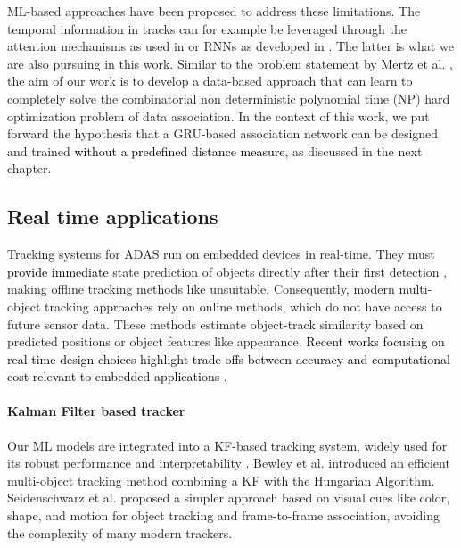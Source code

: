 \documentclass[letterpaper, 10 pt, journal, twoside]{IEEEtran}
\newcommand{\red}[1]{\textcolor{black}{#1}}
\begin{document}
\ac{ML}-based approaches have been proposed to address these limitations.
The temporal information in tracks can for example be leveraged through the attention mechanisms as used in {\cite{DL_ATT_CNN_soda.2020, DL_ATT_CNN_mot_sot_based.2017}} or \acp{RNN} as developed in {\cite{DL_RNN_mot.2016, DL_RNN_data_association.2019}}.
The latter is what we are also pursuing in this work.
Similar to the problem statement by Mertz et al. {\cite{DL_RNN_data_association.2019}}, the aim of our work is to develop a data-based approach that can learn to completely solve the combinatorial non deterministic polynomial time (NP) hard optimization problem of data association.
In the context of this work, we put forward the hypothesis that a \ac{GRU}-based association network can be designed and trained \red{without a predefined distance measure}, as discussed in the next chapter.

\subsection{Real time applications}
Tracking systems for ADAS run on embedded devices in real-time. They must \red{provide immediate} state prediction of objects directly after their first detection {\cite{KF_Bewley.2016,DL_Wojke.2017}}, making offline tracking methods like {\cite{offline_mot.2017}} unsuitable. Consequently, modern multi-object tracking approaches rely on online methods, which do not have access to future sensor data. These methods estimate object-track similarity based on predicted positions or object features like appearance.
\red{Recent works focusing on real-time design choices highlight trade-offs between accuracy and computational cost relevant to embedded applications {\cite{Wang2019RealtimeMOT,Zhou2020CenterTrack}}.}

\paragraph{Kalman Filter based tracker}
Our \ac{ML} models are integrated into a \ac{KF}-based tracking system, widely used for its robust performance and interpretability {\cite{KF_Wan.2000,KF_Ristic.2004,KF_Julier.2004,KF_framework.2013,KF_Bewley.2016,KF_simple_cues.2022,KF_BoundingBD.2023}}. Bewley et al. {\cite{KF_Bewley.2016}} introduced an efficient multi-object tracking method combining a KF with the Hungarian Algorithm. Seidenschwarz et al. {\cite{KF_simple_cues.2022}} proposed a simpler approach based on visual cues like color, shape, and motion for object tracking and frame-to-frame association, avoiding the complexity of many modern trackers.
\end{document}
